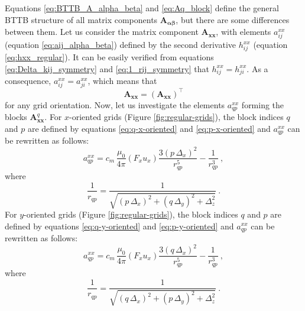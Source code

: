\documentclass[manuscript]{geophysics}
\providecommand{\DIFaddtex}[1]{{\protect\color{blue}\uwave{#1}}} %
\providecommand{\DIFaddbegin}{} %
\providecommand{\DIFaddend}{} %
\providecommand{\DIFadd}[1]{\texorpdfstring{\DIFaddtex{#1}}{#1}} %
\begin{document}
	Equations \ref{eq:BTTB_A_alpha_beta} and \ref{eq:Aq_block} define the general BTTB
	structure of all matrix components $\mathbf{A_{\boldsymbol{\alpha\beta}}}$, but 
	there are some differences between them.
	Let us consider the matrix component $\mathbf{A}_{\boldsymbol{xx}}$, with elements
	$a^{xx}_{ij}$ (equation \ref{eq:aij_alpha_beta}) defined by the second derivative \DIFaddbegin \DIFadd{calculated in
	}\DIFaddend $h^{xx}_{ij}$ (equation \ref{eq:hxx_regular}). It can be easily verified from equations
	\ref{eq:Delta_kij_symmetry} and \ref{eq:1_rij_symmetry} that $h^{xx}_{ij} = h^{xx}_{ji}$.
	As a consequence, $a^{xx}_{ij} = a^{xx}_{ji}$, which means that 
	\begin{equation}
		\mathbf{A}_{\boldsymbol{xx}} = \left( \mathbf{A}_{\boldsymbol{xx}} \right)^{\top}
		\label{eq:Axx_symmetry}
	\end{equation}
	for any grid orientation.
	Now, let us investigate the elements $a^{xx}_{qp}$ forming the blocks $\mathbf{A}_{\boldsymbol{xx}}^{q}$.
	For $x$-oriented grids (Figure \ref{fig:regular-grids}), the block indices $q$ and $p$ are defined 
	by equations \ref{eq:q-x-oriented} and 
	\ref{eq:p-x-oriented} and $a^{xx}_{qp}$ can be rewritten as follows:
	\begin{equation}
		a^{xx}_{qp} = c_{m} \, \frac{\mu_{0}}{4\pi} 
		\left( F_{x} u_{x} \right) \frac{3 \left( p \, \Delta_{x} \right)^{2}}{r_{qp}^{5}} - 
		\frac{1}{r_{qp}^{3}} \: ,
		\label{eq:aqp_xx_x_oriented}
	\end{equation}
	where
	\begin{equation}
		\frac{1}{r_{qp}} = 
		\frac{1}{\sqrt{\left( p \, \Delta_{x} \right)^{2} + \left( q \, \Delta_{y} \right)^{2} + \Delta_{z}^{2}}} \: .
		\label{eq:1_rqp_x_oriented}
	\end{equation}
	For $y$-oriented grids (Figure \ref{fig:regular-grids}), the block indices $q$ and $p$ are 
	defined by equations \ref{eq:q-y-oriented} and 
	\ref{eq:p-y-oriented} and $a^{xx}_{qp}$ can be rewritten as follows:
	\begin{equation}
		a^{xx}_{qp} = c_{m} \, \frac{\mu_{0}}{4\pi} 
		\left( F_{x} u_{x} \right) \frac{3 \left( q \, \Delta_{x} \right)^{2}}{r_{qp}^{5}} - 
		\frac{1}{r_{qp}^{3}} \: ,
		\label{eq:aqp_xx_y_oriented}
	\end{equation}
	where
	\begin{equation}
		\frac{1}{r_{qp}} = 
		\frac{1}{\sqrt{\left( q \, \Delta_{x} \right)^{2} + \left( p \, \Delta_{y} \right)^{2} + \Delta_{z}^{2}}} \: .
		\label{eq:1_rqp_y_oriented}
	\end{equation}
\end{document}
